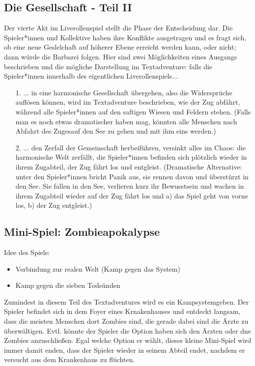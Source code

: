 \documentclass[a4paper, 12pt]{scrartcl}
\begin{document}
    \subsection{Die Gesellschaft - Teil II} \label{die-gesellschaft2}
    Der vierte Akt im Liverollenspiel stellt die Phase der Entscheidung dar. 
    Die Spieler*innen und Kollektive haben ihre Konflikte ausgetragen und es fragt sich, ob eine neue Geslelchaft auf höherer Ebene erreicht werden kann, oder nicht; dann würde die Barbarei folgen.
    Hier sind zwei Möglichkeiten eines Ausgangs beschrieben und die mögliche Darstellung im Textadventure: falls die Spieler*innen innerhalb des eigentlichen Liverollenspiels...
    \begin{itemize}
    \item[1.] ... in eine harmonische Gesellschaft übergehen, also die Widersprüche auflösen können, wird im Textadventure beschrieben, wie der Zug abfährt, während alle Spieler*innen auf den saftigen Wiesen und Feldern stehen. 
    (Falls man es noch etwas dramatischer haben mag, könnten alle Menschen nach Abfahrt des Zugesauf den See zu gehen und mit ihm eins werden.)
    \item[2.] ... den Zerfall der Gemeinschaft herbeiführen, versinkt alles im Chaos: die harmonische Welt zerfällt, die Spieler*innen befinden sich plötzlich wieder in ihrem Zugabteil, der Zug fährt los und entgleist. 
    (Dramatische Alternative: unter den Spieler*innen bricht Panik aus, sie rennen davon und überstürzt in den See.
    Sie fallen in den See, verlieren kurz ihr Bewusstsein und wachen in ihrem Zugabteil wieder auf der Zug fährt los und a) das Spiel geht von vorne los, b) der Zug entgleist.)
    \end{itemize}

    \subsection{Mini-Spiel: Zombieapokalypse} \label{zombieapokalypse}
    Idee des Spiels:
    \begin{itemize}
    \item Verbindung zur realen Welt (Kamp gegen das System)
    \item Kamp gegen die sieben Todsünden
    \end{itemize}
    Zumindest in diesem Teil des Textadventures wird es ein Kampsystemgeben. 
    Der Spieler befindet sich in dem Foyer eines Krnakenhauses und entdeckt langsam, dass die meisten Menschen dort Zombies sind, die gerade dabei sind die Ärzte zu überwältigen. 
    Evtl. könnte der Spieler die Option haben sich den Ärzten oder dne Zombies anzuschließen.
    Egal welche Option er wählt, dieses kleine Mini-Spiel wird immer damit enden, dass der Spieler wieder in seinem Abteil endet, nachdem er versucht aus dem Krankenhaus zu flüchten.
    
\end{document}

